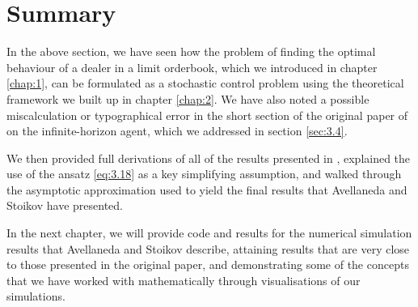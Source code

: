 \section{Summary}\label{sec:3.9}

In the above section, we have seen how the problem of finding the optimal behaviour
of a dealer in a limit orderbook, which we introduced in chapter \ref{chap:1}, can be
formulated as a stochastic control problem using the theoretical framework we built up
in chapter \ref{chap:2}. We have also noted a possible miscalculation or typographical
error in the short section of the original paper of \textcite{AS2008} on the infinite-horizon
agent, which we addressed in section \ref{sec:3.4}. 

We then provided full derivations of all of the results presented in \textcite{AS2008},
explained the use of the ansatz \eqref{eq:3.18} as a key simplifying assumption, and walked
through the asymptotic approximation used to yield the final results that Avellaneda
and Stoikov have presented. 

In the next chapter, we will provide code and results for the
numerical simulation results that Avellaneda and Stoikov describe, attaining results 
that are very close to those presented in the original paper, and demonstrating some
of the concepts that we have worked with mathematically through visualisations of 
our simulations.
